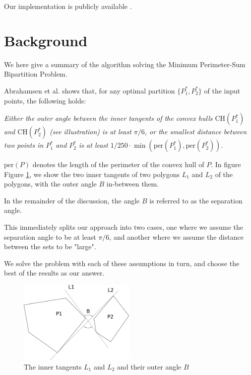 \documentclass{article}
\newcommand{\figref}[1]{Figure \ref{#1}}
\begin{document}
Our implementation is publicly available \cite{hm18}.

\section{Background}


We here give a summary of the algorithm solving the Minimum Perimeter-Sum Bipartition Problem.

Abrahamsen et al. \cite{abb17} shows that, for any optimal partition $\{P_1^*, P_2^*\}$ of the input points, the following holds:

\textit{Either the outer angle between the inner tangents of the convex hulls
$\text{CH}(P_1^*)$ and $\text{CH}(P_2^*)$ (see illustration) is at least $\pi / 6$, or the smallest distance between two
points in $P_1^*$ and $P_2^*$ is at least $1/250 \cdot \min(\text{per}(P_1^*), \text{per}(P_2^*))$}. 

$\text{per}(P)$ denotes the length of the perimeter of the convex hull of $P$. In figure \figref{fig:tangent_angle}, we show the two inner tangents of two polygons $L_1$ and $L_2$ of the polygons, with the outer angle $B$ in-between them.

In the remainder of the discussion, the angle $B$ is referred to as the separation angle.

This immediately splits our approach into two cases, one where we assume the separation angle to be at least $\pi / 6$, and another where we assume the distance between the sets to be "large". 


We solve the problem with each of these assumptions in turn, and choose the best of the results as our answer.


\begin{figure}[ht]
    \centering
    \includegraphics[width=0.5\textwidth]{images/inner_angle.png}
    \caption{The inner tangents $L_1$ and $L_2$ and their outer angle $B$}
    \label{fig:tangent_angle}
\end{figure}
\end{document}
